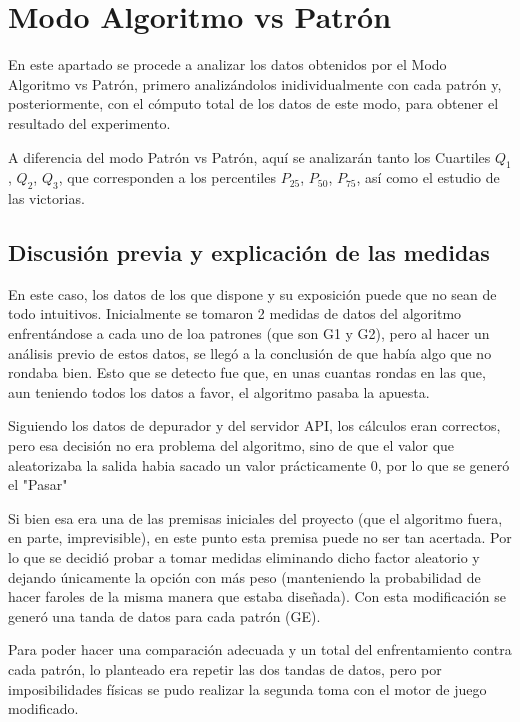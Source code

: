 \section{Modo Algoritmo vs Patrón}


En este apartado se procede a analizar los datos obtenidos por el Modo Algoritmo vs Patrón, primero analizándolos inidividualmente con cada patrón y, posteriormente, con el cómputo total de los datos de este modo, para obtener el resultado del experimento.

A diferencia del modo Patrón vs Patrón, aquí se analizarán tanto los Cuartiles $Q_1$, $Q_2$, $Q_3$, que corresponden a los percentiles $P_{25}$, $P_{50}$, $P_{75}$, así como el estudio de las victorias.

\subsection{Discusión previa y explicación de las medidas}
\label{sec:predisc}

En este caso, los datos de los que dispone y su exposición puede que no sean de todo intuitivos. Inicialmente se tomaron 2 medidas de datos del algoritmo enfrentándose a cada uno de loa patrones (que son G1 y G2), pero al hacer un análisis previo de estos datos, se llegó a la conclusión de que había algo que no rondaba bien. Esto que se detecto fue que, en unas cuantas rondas en las que, aun teniendo todos los datos a favor, el algoritmo pasaba la apuesta.

Siguiendo los datos de depurador y del servidor API, los cálculos eran correctos, pero esa decisión no era problema del algoritmo, sino de que el valor que aleatorizaba la salida habia sacado un valor prácticamente 0, por lo que se generó el "Pasar"

Si bien esa era una de las premisas iniciales del proyecto (que el algoritmo fuera, en parte, imprevisible), en este punto esta premisa puede no ser tan acertada. Por lo que se decidió probar a tomar medidas eliminando dicho factor aleatorio y dejando únicamente la opción con más peso (manteniendo la probabilidad de hacer faroles de la misma manera que estaba diseñada). 
Con esta modificación se generó una tanda de datos para cada patrón (GE).

Para poder hacer una comparación adecuada y un total del enfrentamiento contra cada patrón, lo planteado era repetir las dos tandas de datos, pero por imposibilidades físicas se pudo realizar la segunda toma con el motor de juego modificado. 


